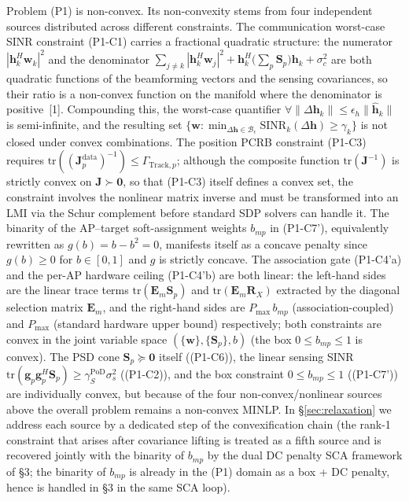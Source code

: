 \documentclass[12pt,a4paper]{article}
\newcommand{\vect}[1]{\mathbf{#1}}
\newcommand{\mat}[1]{\mathbf{#1}}
\newcommand{\tr}{\text{tr}}
\begin{document}
Problem (P1) is non-convex. Its non-convexity stems from four independent sources distributed across different constraints. The communication worst-case SINR constraint (P1-C1) carries a fractional quadratic structure: the numerator $|\vect{h}_k^H \vect{w}_k|^2$ and the denominator $\sum_{j \neq k} |\vect{h}_k^H \vect{w}_j|^2 + \vect{h}_k^H \big(\sum_p \mat{S}_p\big) \vect{h}_k + \sigma_c^2$ are both quadratic functions of the beamforming vectors and the sensing covariances, so their ratio is a non-convex function on the manifold where the denominator is positive~[1]. Compounding this, the worst-case quantifier $\forall \|\Delta\vect{h}_k\| \leq \epsilon_h \|\hat{\vect{h}}_k\|$ is semi-infinite, and the resulting set $\{\vect{w} : \min_{\Delta\vect{h} \in \mathcal{B}_\epsilon} \text{SINR}_k(\Delta\vect{h}) \geq \gamma_k\}$ is not closed under convex combinations. The position PCRB constraint (P1-C3) requires $\tr((\mat{J}_p^{\text{data}})^{-1}) \leq \Gamma_{\text{Track}, p}$; although the composite function $\tr(\mat{J}^{-1})$ is strictly convex on $\mat{J} \succ \mat{0}$, so that (P1-C3) itself defines a convex set, the constraint involves the nonlinear matrix inverse and must be transformed into an LMI via the Schur complement before standard SDP solvers can handle it. The binarity of the AP--target soft-assignment weights $b_{mp}$ in (P1-C7'), equivalently rewritten as $g(b) = b - b^2 = 0$, manifests itself as a concave penalty since $g(b) \geq 0$ for $b \in [0,1]$ and $g$ is strictly concave. The association gate (P1-C4'a) and the per-AP hardware ceiling (P1-C4'b) are both linear: the left-hand sides are the linear trace terms $\tr(\mat{E}_m \mat{S}_p)$ and $\tr(\mat{E}_m \mat{R}_X)$ extracted by the diagonal selection matrix $\mat{E}_m$, and the right-hand sides are $P_{\max} \, b_{mp}$ (association-coupled) and $P_{\max}$ (standard hardware upper bound) respectively; both constraints are convex in the joint variable space $(\{\vect{w}\}, \{\mat{S}_p\}, b)$ (the box $0 \le b_{mp} \le 1$ is convex). The PSD cone $\mat{S}_p \succeq \mat{0}$ itself ((P1-C6)), the linear sensing SINR $\tr(\vect{g}_p \vect{g}_p^H \mat{S}_p) \geq \gamma_S^{\text{PoD}} \sigma_s^2$ ((P1-C2)), and the box constraint $0 \leq b_{mp} \leq 1$ ((P1-C7')) are individually convex, but because of the four non-convex/nonlinear sources above the overall problem remains a non-convex MINLP. In \S\ref{sec:relaxation} we address each source by a dedicated step of the convexification chain (the rank-1 constraint that arises after covariance lifting is treated as a fifth source and is recovered jointly with the binarity of $b_{mp}$ by the dual DC penalty SCA framework of \S3; the binarity of $b_{mp}$ is already in the (P1) domain as a box + DC penalty, hence is handled in \S3 in the same SCA loop).
\end{document}
